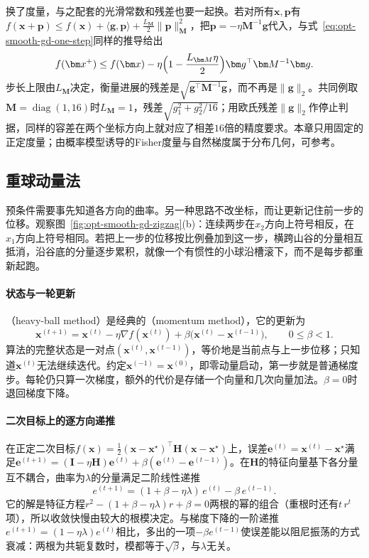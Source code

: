 换了度量，与之配套的光滑常数和残差也要一起换。若对所有$\bm x,\bm p$有$f(\bm x+\bm p)\leq f(\bm x)+\langle\bm g,\bm p\rangle+\tfrac{L_{\bm M}}2\lVert\bm p\rVert_{\bm M}^2$，把$\bm p=-\eta\bm M^{-1}\bm g$代入，与式~\eqref{eq:opt-smooth-gd-one-step}同样的推导给出
\[
  f(\bm x^+)\leq f(\bm x)-\eta\Bigl(1-\frac{L_{\bm M}\eta}2\Bigr)\bm g^\top\bm M^{-1}\bm g .
\]
步长上限由$L_{\bm M}$决定，衡量进展的残差是$\sqrt{\bm g^\top\bm M^{-1}\bm g}$，而不再是$\lVert\bm g\rVert_2$。共同例取$\bm M=\operatorname{diag}(1,16)$时$L_{\bm M}=1$，残差$\sqrt{g_1^2+g_2^2/16}$；用欧氏残差$\lVert\bm g\rVert_2$作停止判据，同样的容差在两个坐标方向上就对应了相差$16$倍的精度要求。本章只用固定的正定度量；由概率模型诱导的Fisher度量与自然梯度属于分布几何，可参考。

\subsection{重球动量法}
\label{sec:opt-smooth-heavy-ball}

预条件需要事先知道各方向的曲率。另一种思路不改坐标，而让更新记住前一步的位移。观察图~\ref{fig:opt-smooth-gd-zigzag}(b)：连续两步在$x_2$方向上符号相反，在$x_1$方向上符号相同。若把上一步的位移按比例叠加到这一步，横跨山谷的分量相互抵消，沿谷底的分量逐步累积，就像一个有惯性的小球沿槽滚下，而不是每步都重新起跑。

\paragraph{状态与一轮更新}
（heavy-ball method）是经典的（momentum method）\cite{polyak1964heavyball}，它的更新为
\begin{equation}
\label{eq:opt-smooth-heavy-ball}
  \bm x^{(t+1)}=\bm x^{(t)}-\eta\nabla f(\bm x^{(t)})+\beta\bigl(\bm x^{(t)}-\bm x^{(t-1)}\bigr),\qquad 0\leq\beta<1 .
\end{equation}
算法的完整状态是一对点$(\bm x^{(t)},\bm x^{(t-1)})$，等价地是当前点与上一步位移；只知道$\bm x^{(t)}$无法继续迭代。约定$\bm x^{(-1)}=\bm x^{(0)}$，即零动量启动，第一步就是普通梯度步。每轮仍只算一次梯度，额外的代价是存储一个向量和几次向量加法。$\beta=0$时退回梯度下降。

\paragraph{二次目标上的逐方向递推}
在正定二次目标$f(\bm x)=\tfrac12(\bm x-\bm x^\star)^\top\bm H(\bm x-\bm x^\star)$上，误差$\bm e^{(t)}=\bm x^{(t)}-\bm x^\star$满足$\bm e^{(t+1)}=(\bm I-\eta\bm H)\bm e^{(t)}+\beta(\bm e^{(t)}-\bm e^{(t-1)})$。在$\bm H$的特征向量基下各分量互不耦合，曲率为$\lambda$的分量满足二阶线性递推
\begin{equation}
\label{eq:opt-smooth-hb-recursion}
  e^{(t+1)}=(1+\beta-\eta\lambda)\,e^{(t)}-\beta\,e^{(t-1)} .
\end{equation}
它的解是特征方程$r^2-(1+\beta-\eta\lambda)r+\beta=0$两根的幂的组合（重根时还有$t\,r^t$项），所以收敛快慢由较大的根模决定。与梯度下降的一阶递推$e^{(t+1)}=(1-\eta\lambda)e^{(t)}$相比，多出的一项$-\beta e^{(t-1)}$使误差能以阻尼振荡的方式衰减：两根为共轭复数时，模都等于$\sqrt\beta$，与$\lambda$无关。

